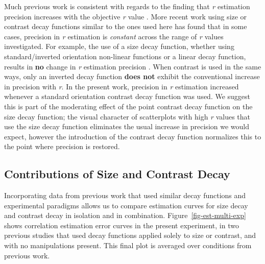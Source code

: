 \documentclass[manuscript, review, anonymous, screen]{acmart}
\begin{document}
Much previous work is consistent with regards to the finding that
\emph{r} estimation precision increases with the objective \emph{r}
value
\citep{rensink_2010, rensink_2012, rensink_2014, rensink_2017, doherty_2007}.
More recent work using size or contrast decay functions similar to the
ones used here \citep{strain_2023, strain_2023b} has found that in some
cases, precision in \emph{r} estimation is \emph{constant} across the
range of \emph{r} values investigated. For example, the use of a size
decay function, whether using standard/inverted orientation non-linear
functions or a linear decay function, results in \textbf{no} change in
\emph{r} estimation precision \citep{strain_2023b}. When contrast is
used in the same ways, only an inverted decay function \textbf{does not}
exhibit the conventional increase in precision with \emph{r}. In the
present work, precision in \emph{r} estimation increased whenever a
standard orientation contrast decay function was used. We suggest this
is part of the moderating effect of the point contrast decay function on
the size decay function; the visual character of scatterplots with high
\emph{r} values that use the size decay function eliminates the usual
increase in precision we would expect, however the introduction of the
contrast decay function normalizes this to the point where precision is
restored.

\hypertarget{contributions-of-size-and-contrast-decay}{%
\subsection{Contributions of Size and Contrast
Decay}\label{contributions-of-size-and-contrast-decay}}

Incorporating data from previous work \citep{strain_2023, strain_2023b}
that used similar decay functions and experimental paradigms allows us
to compare estimation curves for size decay and contrast decay in
isolation and in combination. Figure~\ref{fig-est-multi-exp} shows
correlation estimation error curves in the present experiment, in two
previous studies that used decay functions applied solely to size or
contrast, and with no manipulations present. This final plot is averaged
over conditions from previous work.
\end{document}
